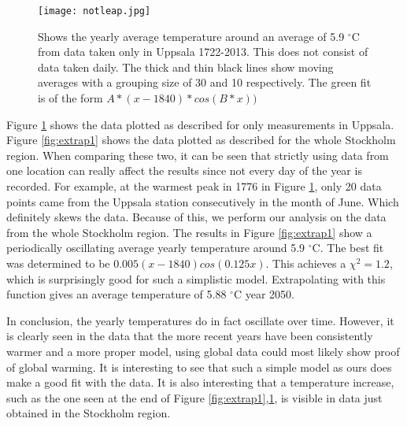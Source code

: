 \begin{figure}[h!]
\begin{center}
\texttt{[image: notleap.jpg]}
\caption{\label{fig:extrap2}Shows the yearly average temperature around an average of 5.9 $^{\circ}$C from data taken only in Uppsala 1722-2013. This does not consist of data taken daily. The thick and thin black lines show moving averages with a grouping size of 30 and 10 respectively. The green fit is of the form $A*(x-1840)*cos(B*x))$}
\end{center}
\end{figure}

Figure \ref{fig:extrap2} shows the data plotted as described for only measurements in Uppsala. Figure \ref{fig:extrap1} shows the data plotted as described for the whole Stockholm region. When comparing these two, it can be seen that strictly using data from one location can really affect the results since not every day of the year is recorded. For example, at the warmest peak in 1776 in Figure \ref{fig:extrap2}, only 20 data points came from the Uppsala station consecutively in the month of June. Which definitely skews the data. Because of this, we perform our analysis on the data from the whole Stockholm region. The results in Figure \ref{fig:extrap1} show a periodically oscillating average yearly temperature around 5.9 $^{\circ}$C. The best fit was determined to be $0.005(x-1840)cos(0.125x)$. This achieves a $\chi ^2=1.2$, which is surprisingly good for such a simplistic model. Extrapolating with this function gives an average temperature of 5.88 $^{\circ}$C year 2050. 

In conclusion, the yearly temperatures do in fact oscillate over time. However, it is clearly seen in the data that the more recent years have been consistently warmer and a more proper model, using global data could most likely show proof of global warming. It is interesting to see that such a simple model as ours does make a good fit with the data. It is also interesting that a temperature increase, such as the one seen at the end of Figure \ref{fig:extrap1},\ref{fig:extrap2}, is visible in data just obtained in the Stockholm region.






